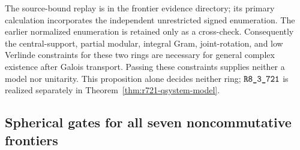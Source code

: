 The source-bound replay is
 in the frontier
evidence directory; its primary calculation incorporates the independent
unrestricted signed enumeration. The earlier normalized enumeration is
retained only as a cross-check. Consequently the central-support, partial
modular, integral Gram, joint-rotation, and low Verlinde constraints for
these two rings are necessary for general complex existence after Galois
transport. Passing these constraints supplies neither a model nor
unitarity. This proposition alone decides neither ring; $\sha{R8_3_721}$ is realized separately in Theorem~\ref{thm:r721-qsystem-model}.

\subsection{Spherical gates for all seven noncommutative frontiers}
\label{subsec:frontier-nc-quartic-and-tests}

